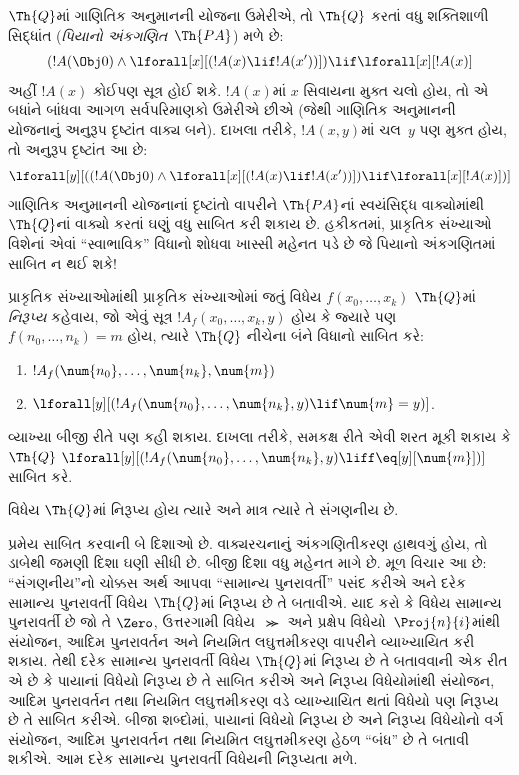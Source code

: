 $\Th{Q}$માં ગાણિતિક અનુમાનની યોજના ઉમેરીએ,
તો $\Th{Q}$ કરતાં વધુ શક્તિશાળી સિદ્ધાંત
(\emph{પિયાનો અંકગણિત}~$\Th{PA}$)
મળે છે:
\[
(!A(\Obj 0) \land \lforall[x][(!A(x) \lif !A(x'))]) \lif \lforall[x][!A(x)]
\]
અહીં $!A(x)$ કોઈપણ સૂત્ર હોઈ શકે.
$!A(x)$માં $x$ સિવાયના મુક્ત
ચલો હોય, તો એ બધાંને બાંધવા
આગળ સર્વપરિમાણકો ઉમેરીએ છીએ
(જેથી ગાણિતિક અનુમાનની યોજનાનું અનુરૂપ દૃષ્ટાંત
વાક્ય બને). દાખલા તરીકે,
$!A(x, y)$માં ચલ~$y$
પણ મુક્ત હોય, તો અનુરૂપ દૃષ્ટાંત આ છે:
\[
\lforall[y][((!A(\Obj 0) \land \lforall[x][(!A(x) \lif !A(x'))]) \lif
  \lforall[x][!A(x)])]
\]
ગાણિતિક અનુમાનની યોજનાનાં દૃષ્ટાંતો વાપરીને
$\Th{PA}$નાં સ્વયંસિદ્ધ વાક્યોમાંથી
$\Th{Q}$નાં વાક્યો કરતાં ઘણું વધુ
સાબિત કરી શકાય છે. હકીકતમાં,
પ્રાકૃતિક સંખ્યાઓ વિશેનાં એવાં
``સ્વાભાવિક'' વિધાનો શોધવા ખાસ્સી
મહેનત પડે છે જે પિયાનો અંકગણિતમાં
સાબિત ન થઈ શકે!{}

\begin{defn}
  પ્રાકૃતિક સંખ્યાઓમાંથી પ્રાકૃતિક
  સંખ્યાઓમાં જતું વિધેય
  $f(x_0,\ldots,x_k)$
  {$\Th{Q}$માં \emph{નિરૂપ્ય}}
  કહેવાય, જો એવું સૂત્ર
  $!A_f(x_0,\dots,x_k,y)$ હોય કે
  જ્યારે પણ $f(n_0,\dots,n_k) = m$
  હોય, ત્યારે $\Th{Q}$ નીચેના
  બંને વિધાનો સાબિત કરે:
\begin{enumerate}
\item{} $!A_f(\num{n_0}, \dots, \num{n_k}, \num{m})$
\item{} $\lforall[y][(!A_f(\num{n_0}, \dots,
\num{n_k}, y) \lif \num{m} = y)]$.
\end{enumerate}
\end{defn}

વ્યાખ્યા બીજી રીતે પણ કહી શકાય.
દાખલા તરીકે, સમકક્ષ રીતે એવી
શરત મૂકી શકાય કે $\Th{Q}$
$\lforall[y][(!A_f(\num{n_0}, \dots,
\num{n_k}, y) \liff \eq[y][\num{m}])]$
સાબિત કરે.

\begin{thm}
વિધેય $\Th{Q}$માં નિરૂપ્ય હોય ત્યારે
અને માત્ર ત્યારે તે સંગણનીય છે.
\end{thm}

પ્રમેય સાબિત કરવાની બે દિશાઓ છે.
વાક્યરચનાનું અંકગણિતીકરણ હાથવગું
હોય, તો ડાબેથી જમણી દિશા ઘણી
સીધી છે. બીજી દિશા વધુ મહેનત માગે
છે. મૂળ વિચાર આ છે: ``સંગણનીય''નો
ચોક્કસ અર્થ આપવા ``સામાન્ય
પુનરાવર્તી'' પસંદ કરીએ અને દરેક
સામાન્ય પુનરાવર્તી વિધેય
$\Th{Q}$માં નિરૂપ્ય છે તે બતાવીએ.
યાદ કરો કે વિધેય સામાન્ય પુનરાવર્તી
છે જો તે $\Zero$, ઉત્તરગામી
વિધેય~$\Succ$ અને પ્રક્ષેપ
વિધેયો~$\Proj{n}{i}$માંથી સંયોજન,
આદિમ પુનરાવર્તન અને નિયમિત
લઘુત્તમીકરણ વાપરીને વ્યાખ્યાયિત
કરી શકાય. તેથી દરેક સામાન્ય
પુનરાવર્તી વિધેય $\Th{Q}$માં
નિરૂપ્ય છે તે બતાવવાની એક રીત
એ છે કે પાયાનાં વિધેયો નિરૂપ્ય છે
તે સાબિત કરીએ અને નિરૂપ્ય
વિધેયોમાંથી સંયોજન, આદિમ
પુનરાવર્તન તથા નિયમિત
લઘુત્તમીકરણ વડે વ્યાખ્યાયિત
થતાં વિધેયો પણ નિરૂપ્ય છે તે
સાબિત કરીએ. બીજા શબ્દોમાં,
પાયાનાં વિધેયો નિરૂપ્ય છે અને
નિરૂપ્ય વિધેયોનો વર્ગ સંયોજન,
આદિમ પુનરાવર્તન તથા નિયમિત
લઘુત્તમીકરણ હેઠળ ``બંધ'' છે
તે બતાવી શકીએ. આમ દરેક સામાન્ય
પુનરાવર્તી વિધેયની નિરૂપ્યતા મળે.

